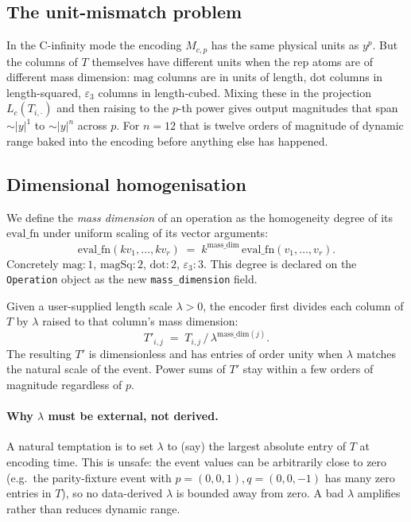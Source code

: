 \documentclass[a4paper,11pt]{article}
\begin{document}
\subsection{The unit-mismatch problem}

In the C-infinity mode the encoding $M_{c, p}$ has the same physical
units as $y^p$.  But the columns of $T$ themselves have different
units when the rep atoms are of different mass dimension: $\text{mag}$
columns are in units of length, $\text{dot}$ columns in length-squared,
$\varepsilon_3$ columns in length-cubed.  Mixing these in the
projection $L_c(T_{i, \cdot})$ and then raising to the $p$-th power
gives output magnitudes that span $\sim |y|^1$ to $\sim |y|^n$ across
$p$.  For $n = 12$ that is twelve orders of magnitude of dynamic range
baked into the encoding before anything else has happened.

\subsection{Dimensional homogenisation}

We define the \emph{mass dimension} of an operation as the homogeneity
degree of its $\text{eval\_fn}$ under uniform scaling of its vector
arguments:
\[
  \text{eval\_fn}(k v_1, \ldots, k v_r)
  \;=\; k^{\text{mass\_dim}}\, \text{eval\_fn}(v_1, \ldots, v_r).
\]
Concretely
$\text{mag}\!:1$,
$\text{magSq}\!:2$,
$\text{dot}\!:2$,
$\varepsilon_3\!:3$.
This degree is declared on the \texttt{Operation} object as the new
\texttt{mass\_dimension} field.

Given a user-supplied length scale $\lambda > 0$, the encoder first
divides each column of $T$ by $\lambda$ raised to that column's mass
dimension:
\[
  T'_{i, j} \;=\; T_{i, j}\, /\, \lambda^{\text{mass\_dim}(j)}.
\]
The resulting $T'$ is dimensionless and has entries of order unity
when $\lambda$ matches the natural scale of the event.  Power sums of
$T'$ stay within a few orders of magnitude regardless of $p$.

\paragraph{Why $\lambda$ must be external, not derived.}
A natural temptation is to set $\lambda$ to (say) the largest absolute
entry of $T$ at encoding time.  This is unsafe: the event values can
be arbitrarily close to zero (e.g.\ the parity-fixture event with
$p = (0,0,1), q = (0,0,-1)$ has many zero entries in $T$), so no
data-derived $\lambda$ is bounded away from zero.  A bad $\lambda$
amplifies rather than reduces dynamic range.
\end{document}
